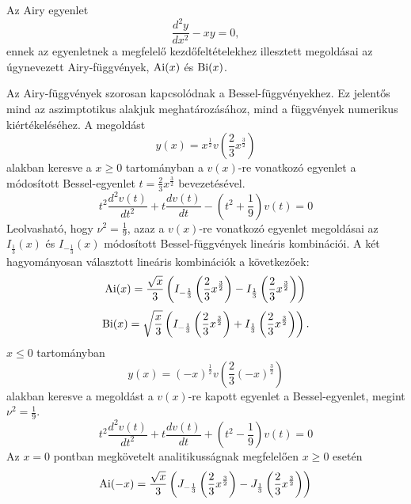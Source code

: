 \label{airy}
Az Airy egyenlet
\begin{equation}
	\frac{d^2y}{dx^2} - xy = 0,
	\label{airy:airyeq}
\end{equation}
ennek az egyenletnek a megfelelő kezdőfeltételekhez illesztett megoldásai az úgynevezett Airy-függvények, $\operatorname{Ai}(x)$ és $\operatorname{Bi}(x)$.

Az Airy-függvények szorosan kapcsolódnak a Bessel-függvényekhez. Ez jelentős mind az aszimptotikus alakjuk meghatározásához, mind a függvények numerikus kiértékeléséhez. A megoldást
\begin{equation}
	y(x) = x^{\frac{1}{2}}v\left(\frac{2}{3}x^{\frac{3}{2}}\right)
\end{equation}
alakban keresve a $x \geq 0$ tartományban a $v(x)$-re vonatkozó egyenlet a módosított Bessel-egyenlet $t=\frac{2}{3}x^{\frac{3}{2}}$ bevezetésével.
\begin{equation}
	t^2\frac{d^2v(t)}{dt^2} + t\frac{dv(t)}{dt} - \left(t^2 + \frac{1}{9}\right)v(t) = 0
\end{equation}
Leolvasható, hogy $\nu^2 = \frac{1}{9}$, azaz a $v(x)$-re vonatkozó egyenlet megoldásai az $I_{\frac{1}{3}}(x)$ és $I_{-\frac{1}{3}}(x)$ módosított Bessel-függvények lineáris kombinációi.
A két hagyományosan választott lineáris kombinációk a következőek:
\begin{equation}
	\operatorname{Ai}(x) = \frac{\sqrt{x}}{3}\left(I_{-\frac{1}{3}}\left(\frac{2}{3}x^{\frac{3}{2}}\right)-I_{\frac{1}{3}}\left(\frac{2}{3}x^{\frac{3}{2}}\right)\right)
	\label{airy:ai+}
\end{equation}
\begin{equation}
	\operatorname{Bi}(x) = \sqrt{\frac{x}{3}}\left(I_{-\frac{1}{3}}\left(\frac{2}{3}x^{\frac{3}{2}}\right)+I_{\frac{1}{3}}\left(\frac{2}{3}x^{\frac{3}{2}}\right)\right).
	\label{airy:ai+}
\end{equation}
$x \leq 0$ tartományban
\begin{equation}
	y(x) = (-x)^{\frac{1}{2}}v\left(\frac{2}{3}(-x)^{\frac{3}{2}}\right)
\end{equation}
alakban keresve a megoldást a $v(x)$-re kapott egyenlet a Bessel-egyenlet, megint $\nu^2 = \frac{1}{9}$.
\begin{equation}
	t^2\frac{d^2v(t)}{dt^2} + t\frac{dv(t)}{dt} + \left(t^2 - \frac{1}{9}\right)v(t) = 0
\end{equation}
Az $x=0$ pontban megkövetelt analitikusságnak megfelelően $x \geq 0$ esetén
\begin{equation}
	\operatorname{Ai}(-x) = \frac{\sqrt{x}}{3}\left(J_{-\frac{1}{3}}\left(\frac{2}{3}x^{\frac{3}{2}}\right)-J_{\frac{1}{3}}\left(\frac{2}{3}x^{\frac{3}{2}}\right)\right)
	\label{airy:ai-}
\end{equation}
